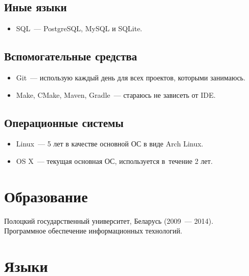     \subsection*{Иные языки}

      \begin{itemize}

        \item SQL~--- PostgreSQL, MySQL и SQLite.

      \end{itemize}

    \subsection*{Вспомогательные средства}

      \begin{itemize}

        \item Git~--- использую каждый день для всех проектов, которыми занимаюсь.

        \item Make, CMake, Maven, Gradle~--- стараюсь не зависеть от IDE.

      \end{itemize}

    \subsection*{Операционные системы}

      \begin{itemize}

        \item Linux~--- 5 лет в качестве основной ОС в виде Arch Linux.

        \item OS X~--- текущая основная ОС, используется в~течение 2 лет.

      \end{itemize}


  \section*{Образование}

    Полоцкий государственный университет, Беларусь (2009~--- 2014). \\
    Программное обеспечение информационных технологий.


  \section*{Языки}

